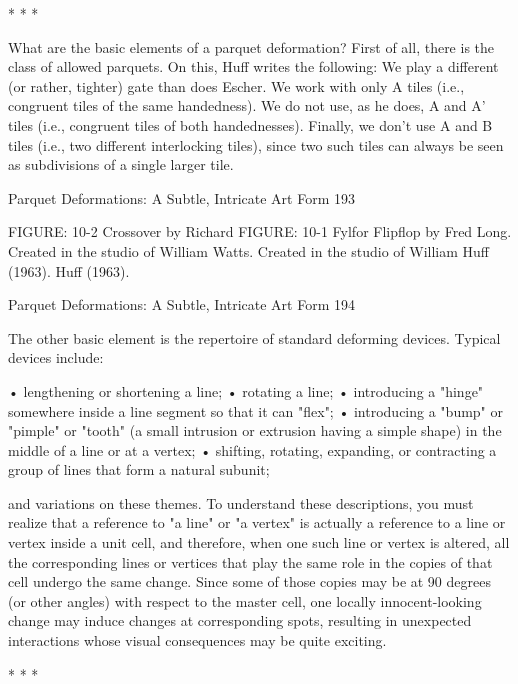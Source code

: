                                       *       *       *

         What are the basic elements of a parquet deformation? First of all, there is the
class of allowed parquets. On this, Huff writes the following:
         We play a different (or rather, tighter) gate than does Escher. We work with only
A tiles (i.e., congruent tiles of the same handedness). We do not use, as he does, A and A'
tiles (i.e., congruent tiles of both handednesses). Finally, we don't use A and B tiles (i.e.,
two different interlocking tiles), since two such tiles can always be seen as subdivisions
of a single larger tile.




Parquet Deformations: A Subtle, Intricate Art Form                                        193

                                               FIGURE: 10-2 Crossover by Richard
FIGURE: 10-1 Fylfor Flipflop by Fred           Long. Created in the studio of William
Watts. Created in the studio of William        Huff (1963).
Huff (1963).




Parquet Deformations: A Subtle, Intricate Art Form                                 194

The other basic element is the repertoire of standard deforming devices. Typical devices
include:

    • lengthening or shortening a line;
    • rotating a line;
    • introducing a "hinge" somewhere inside a line segment so that it can "flex";
    • introducing a "bump" or "pimple" or "tooth" (a small intrusion or extrusion
      having a simple shape) in the middle of a line or at a vertex;
    • shifting, rotating, expanding, or contracting a group of lines that form a natural
      subunit;

and variations on these themes. To understand these descriptions, you must realize that a
reference to "a line" or "a vertex" is actually a reference to a line or vertex inside a unit
cell, and therefore, when one such line or vertex is altered, all the corresponding lines or
vertices that play the same role in the copies of that cell undergo the same change. Since
some of those copies may be at 90 degrees (or other angles) with respect to the master
cell, one locally innocent-looking change may induce changes at corresponding spots,
resulting in unexpected interactions whose visual consequences may be quite exciting.

*   *   *

